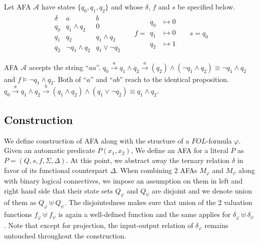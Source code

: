 \begin{example}
Let AFA \( \mathcal{A} \) have 
states \( \{q_0, q_1, q_2\} \) and whose \( \delta \), \( f \) and \(
s \) be specified below.
\begin{align*}
  \begin{array}{c|cc}
    \delta & a & b \\\hline
    q_0 & q_1 \wedge q_2      & 0              \\
    q_1 & q_2                 & q_1 \wedge q_2 \\
    q_2 & \neg q_1 \wedge q_2 & q_1 \vee \neg q_2
  \end{array}&& f = \begin{smallmatrix}q_0 &\mapsto 0\\q_1 &\mapsto 0\\q_2 &\mapsto 1\end{smallmatrix} && s = q_0
\end{align*}

AFA \( \mathcal{A} \) accepts the string ``\( aa \)''. \(q_0
\xrightarrow[]a q_1 \wedge q_2 \xrightarrow[]a (q_2)
\wedge (\neg q_1 \wedge q_2) \equiv \neg q_1 \wedge q_2 \) and \( f \models \neg
q_1 \wedge q_2 \). Both of ``\(a\)'' and ``\( ab \)'' reach to the identical proposition. \(q_0
\xrightarrow[]a q_1 \wedge q_2 \xrightarrow[]b (q_1 \wedge q_2)
\wedge (q_1 \vee \neg q_2) \equiv q_1 \wedge q_2 \).

\end{example}

\subsection{Construction}

We define construction of AFA along with the structure of a \( \mathit{FOL}
\)-formula \( \varphi \). Given an automatic predicate \( P(x_1, x_2) \), We
define an AFA for a literal \( P \) as \( P = (Q, s, f, \Sigma, \Delta) \). At
this point, we abstract away the ternary relation \( \delta \) in favor of its
functional counterpart \( \Delta \). When combining 2 AFAs \( \mathit{M}_\varphi
\) and \( \mathit{M}_\psi \) along with binary logical connectives, we impose an
assumption on them in left and right hand side that their state sets \(
Q_\varphi \) and \( Q_\psi \) are disjoint and we denote union of them as \(
Q_\varphi \uplus Q_\psi \).  The disjointedness makes sure that union of the 2
valuation functions \( f_\varphi \uplus f_\psi \) is again a well-defined
function and the same applies for \( \delta_\varphi \uplus \delta_\psi \). Note
that except for projection, the input-output relation of \( \delta_{\varphi} \)
remains untouched throughout the construction.

